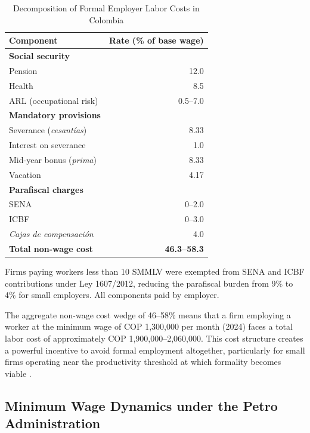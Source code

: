 \documentclass[5p,times,authoryear]{elsarticle}
\begin{document}
\begin{table}[htbp]
\centering
\begin{threeparttable}
\caption{Decomposition of Formal Employer Labor Costs in Colombia}
\label{tab:cost_decomposition}
\small
\setlength{\tabcolsep}{4pt}
\begin{tabular}{@{}lr@{}}
\toprule
Component & Rate (\% of base wage) \\
\midrule
\textbf{Social security} & \\
\quad Pension & 12.0 \\
\quad Health & 8.5 \\
\quad ARL (occupational risk) & 0.5--7.0 \\
\textbf{Mandatory provisions} & \\
\quad Severance (\textit{cesant\'{i}as}) & 8.33 \\
\quad Interest on severance & 1.0 \\
\quad Mid-year bonus (\textit{prima}) & 8.33 \\
\quad Vacation & 4.17 \\
\textbf{Parafiscal charges}\tnote{a} & \\
\quad SENA & 0--2.0 \\
\quad ICBF & 0--3.0 \\
\quad \textit{Cajas de compensaci\'{o}n} & 4.0 \\
\midrule
\textbf{Total non-wage cost} & \textbf{46.3--58.3} \\
\bottomrule
\end{tabular}
\begin{tablenotes}
\footnotesize
\item[a] Firms paying workers less than 10 SMMLV were exempted from SENA and ICBF contributions under Ley 1607/2012, reducing the parafiscal burden from 9\% to 4\% for small employers. All components paid by employer.
\end{tablenotes}
\end{threeparttable}
\end{table}

The aggregate non-wage cost wedge of 46--58\% means that a firm employing a worker at the minimum wage of COP 1,300,000 per month (2024) faces a total labor cost of approximately COP 1,900,000--2,060,000. This cost structure creates a powerful incentive to avoid formal employment altogether, particularly for small firms operating near the productivity threshold at which formality becomes viable \citep{ulyssea2018}.

\subsection{Minimum Wage Dynamics under the Petro Administration}
\label{subsec:mw_dynamics}
\end{document}
